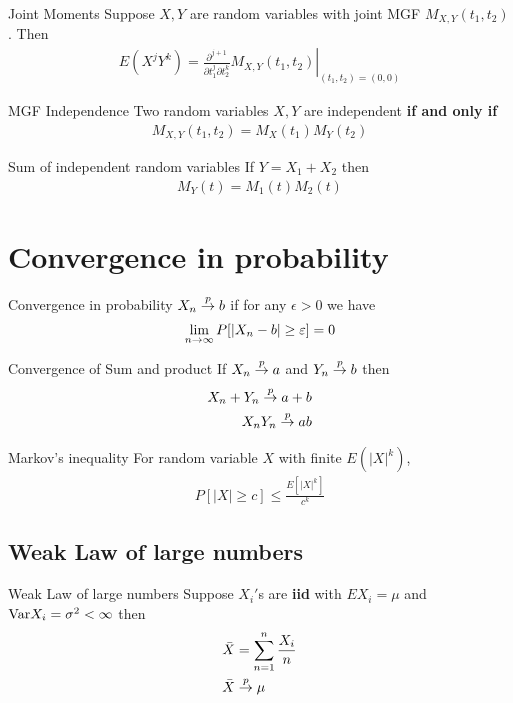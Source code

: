 \documentclass[16pt,a4paper]{article}
\begin{document}
\begin{thm}{Joint Moments}
Suppose $X,Y$ are random variables with joint MGF $M_{X,Y}(t_1,t_2)$. Then 
\begin{align*}
E(X^jY^k) = \left.\frac{\partial^{j+1}}{\partial t_1^j \partial t_2^k} M_{X,Y}(t_1,t_2) \right|_{(t_1, t_2) = (0,0)}
\end{align*}
\end{thm}

\begin{thm}{MGF Independence}
Two random variables $X,Y$ are independent  \textbf{if and only if}
\begin{align*}
M_{X,Y}(t_1, t_2) = M_X(t_1)M_Y(t_2)
\end{align*} 
\end{thm}

\begin{thm}{ Sum of independent random variables}
If $Y = X_1 + X_2$ then 
\begin{align*}
M_Y(t)  = M_1(t)M_2(t)
\end{align*}
\end{thm}
\newpage
\section{Convergence in probability}
\begin{defn}{Convergence in probability}
$X_n \overset{p}{\to} b$ if for any $\epsilon > 0$ we have 
\begin{align*}
\lim\limits_{n \rightarrow \infty} P[|X_n-b| \geq \varepsilon ] = 0
\end{align*}
\end{defn}
\begin{thm}{Convergence of Sum and product}
If $X_n \overset{p}{\to} a$ and $Y_n \overset{p}{\to} b$ then 
\begin{align*}
X_n + Y_n \overset{p}{\to} a+b\\
X_nY_n \overset{p}{\to} ab
\end{align*}
\end{thm}
\begin{thm}{Markov's inequality}
For random variable $X$ with finite $E(|X|^k)$, 
\begin{align*}
P[|X| \geq c] \leq \frac{E[|X|^k]}{c^k}
\end{align*}
\end{thm}
\subsection{Weak Law of large numbers}
\begin{thm}{Weak Law of large numbers}
Suppose $X_i'$s are \textbf{iid} with $EX_i = \mu$ and $\mathrm{Var} X_i = \sigma^2 < \infty$ then 
\begin{align*}
&\bar{X} = \sum_{n=1}^n \frac{X_i}{n}\\
&\bar{X} \overset{p}{\to} \mu
\end{align*}
\end{thm}
\end{document}
